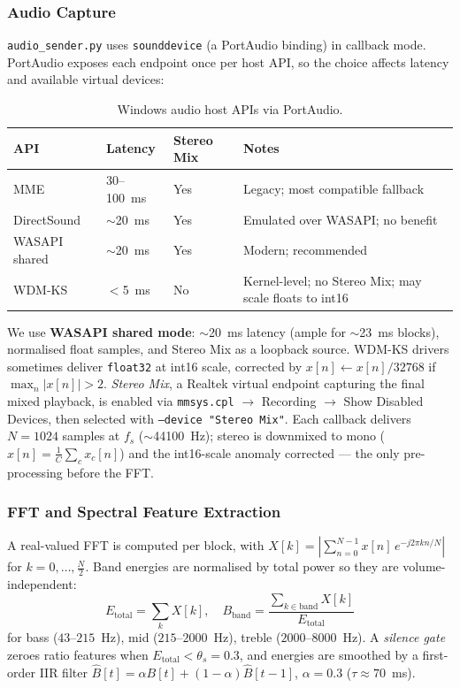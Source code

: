 \subsubsection{Audio Capture}
\label{ssec:capture}

\texttt{audio\_sender.py} uses \texttt{sounddevice} (a PortAudio binding) in
callback mode. PortAudio exposes each endpoint once per host API, so the choice
affects latency and available virtual devices:

\begin{table}[h]
\centering
\caption{Windows audio host APIs via PortAudio.}
\label{tab:apis}
\begin{tabular}{lllp{4.4cm}}
\toprule
\textbf{API} & \textbf{Latency} & \textbf{Stereo Mix} & \textbf{Notes} \\
\midrule
MME          & 30--100~ms & Yes & Legacy; most compatible fallback \\
DirectSound  & $\sim$20~ms & Yes & Emulated over WASAPI; no benefit \\
WASAPI shared& $\sim$20~ms & Yes & Modern; recommended \\
WDM-KS       & $<$5~ms    & No  & Kernel-level; no Stereo Mix; may scale floats to int16 \\
\bottomrule
\end{tabular}
\end{table}

We use \textbf{WASAPI shared mode}: $\sim$20~ms latency (ample for $\sim$23~ms
blocks), normalised float samples, and Stereo Mix as a loopback source. WDM-KS
drivers sometimes deliver \texttt{float32} at int16 scale, corrected by
$x[n] \leftarrow x[n]/32768$ if $\max_n|x[n]|>2$. \textit{Stereo Mix}, a Realtek
virtual endpoint capturing the final mixed playback, is enabled via
\texttt{mmsys.cpl} $\to$ Recording $\to$ Show Disabled Devices, then selected
with \texttt{--device "Stereo Mix"}. Each callback delivers $N=1024$ samples at
$f_s$ ($\sim$44100~Hz); stereo is downmixed to mono ($x[n]=\frac1C\sum_c x_c[n]$)
and the int16-scale anomaly corrected --- the only pre-processing before the FFT.

\subsubsection{FFT and Spectral Feature Extraction}
\label{ssec:fft}

A real-valued FFT is computed per block, with
$X[k]=|\sum_{n=0}^{N-1} x[n]\,e^{-j2\pi kn/N}|$ for $k=0,\dots,\tfrac{N}{2}$.
Band energies are normalised by total power so they are volume-independent:
\begin{equation}
E_{\mathrm{total}}=\textstyle\sum_k X[k],\quad
B_{\mathrm{band}}=\frac{\sum_{k\in\text{band}}X[k]}{E_{\mathrm{total}}}
\end{equation}
for bass ($43$--$215$~Hz), mid ($215$--$2000$~Hz), treble ($2000$--$8000$~Hz). A
\emph{silence gate} zeroes ratio features when $E_{\mathrm{total}}<\theta_s=0.3$,
and energies are smoothed by a first-order IIR filter
$\hat{B}[t]=\alpha B[t]+(1-\alpha)\hat{B}[t-1]$, $\alpha=0.3$ ($\tau\approx70$~ms).

